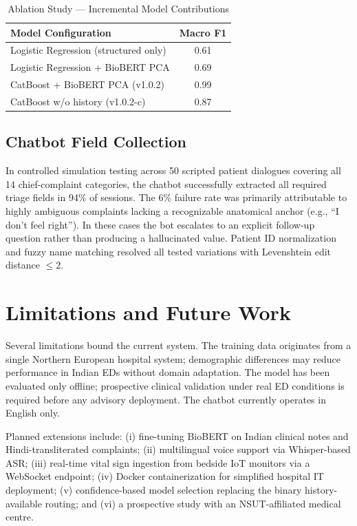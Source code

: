 \documentclass[conference]{IEEEtran}
\begin{document}
\begin{table}[t]
\caption{Ablation Study --- Incremental Model Contributions}
\label{tab:ablation}
\renewcommand{\arraystretch}{1.2}
\begin{tabularx}{\columnwidth}{Xc}
\toprule
\textbf{Model Configuration} & \textbf{Macro F1} \\
\midrule
Logistic Regression (structured only) & 0.61 \\
Logistic Regression + BioBERT PCA & 0.69 \\
CatBoost + BioBERT PCA (v1.0.2) & 0.99 \\
CatBoost w/o history (v1.0.2-c) & 0.87 \\
\bottomrule
\end{tabularx}
\end{table}

\subsection{Chatbot Field Collection}
In controlled simulation testing across 50 scripted patient dialogues covering all 14 chief-complaint categories, the chatbot successfully extracted all required triage fields in 94\% of sessions. The 6\% failure rate was primarily attributable to highly ambiguous complaints lacking a recognizable anatomical anchor (e.g., ``I don't feel right''). In these cases the bot escalates to an explicit follow-up question rather than producing a hallucinated value. Patient ID normalization and fuzzy name matching resolved all tested variations with Levenshtein edit distance $\le2$.

\section{Limitations and Future Work}

Several limitations bound the current system. The training data originates from a single Northern European hospital system; demographic differences may reduce performance in Indian EDs without domain adaptation. The model has been evaluated only offline; prospective clinical validation under real ED conditions is required before any advisory deployment. The chatbot currently operates in English only.

Planned extensions include: (i) fine-tuning BioBERT on Indian clinical notes and Hindi-transliterated complaints; (ii) multilingual voice support via Whisper-based ASR; (iii) real-time vital sign ingestion from bedside IoT monitors via a WebSocket endpoint; (iv) Docker containerization for simplified hospital IT deployment; (v) confidence-based model selection replacing the binary history-available routing; and (vi) a prospective study with an NSUT-affiliated medical centre.
\end{document}
